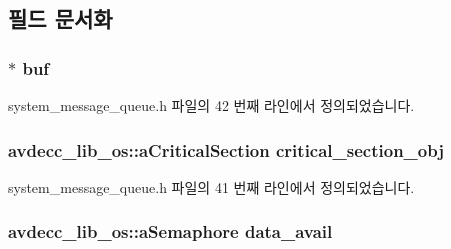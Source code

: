 \subsection{필드 문서화}
\subsubsection[{\texorpdfstring{buf}{buf}}]{ $\ast$ buf\hspace{0.3cm}{\ttfamily [private]}}\hypertarget{classsystem__message__queue_aadd9bbd25ba620d8f3ff6cbea51fdf74}{}\label{classsystem__message__queue_aadd9bbd25ba620d8f3ff6cbea51fdf74}


system\+\_\+message\+\_\+queue.\+h 파일의 42 번째 라인에서 정의되었습니다.

\subsubsection[{\texorpdfstring{critical\+\_\+section\+\_\+obj}{critical_section_obj}}]{\setlength{\rightskip}{0pt plus 5cm}avdecc\+\_\+lib\+\_\+os\+::a\+Critical\+Section critical\+\_\+section\+\_\+obj\hspace{0.3cm}{\ttfamily [private]}}\hypertarget{classsystem__message__queue_a9beb7fdaef1ac126993e7448e60dff66}{}\label{classsystem__message__queue_a9beb7fdaef1ac126993e7448e60dff66}


system\+\_\+message\+\_\+queue.\+h 파일의 41 번째 라인에서 정의되었습니다.

\subsubsection[{\texorpdfstring{data\+\_\+avail}{data_avail}}]{\setlength{\rightskip}{0pt plus 5cm}avdecc\+\_\+lib\+\_\+os\+::a\+Semaphore data\+\_\+avail\hspace{0.3cm}{\ttfamily [private]}}\hypertarget{classsystem__message__queue_a9ca216ead58e46e9cd2e0b7b7d250707}{}\label{classsystem__message__queue_a9ca216ead58e46e9cd2e0b7b7d250707}



